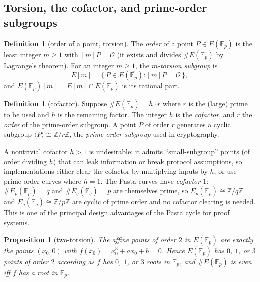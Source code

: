 \documentclass[11pt,a4paper]{article}
\newtheorem{proposition}[theorem]{Proposition}
\theoremstyle{definition}
\newtheorem{definition}[theorem]{Definition}
\theoremstyle{remark}
\newcommand{\Z}{\ensuremath{\mathbb{Z}}}
\newcommand{\Fp}{\ensuremath{\mathbb{F}_{p}}}
\newcommand{\Fq}{\ensuremath{\mathbb{F}_{q}}}
\begin{document}
\subsection{Torsion, the cofactor, and prime-order subgroups}

\begin{definition}[order of a point, torsion]\label{ellipticcurves:def-torsion}
The \emph{order} of a point \(P \in E(\Fp)\) is the least integer \(m \geq 1\) with \([m]P = \mathcal{O}\) (it exists and divides \(\#E(\Fp)\) by Lagrange's theorem). For an integer \(m \geq 1\), the \emph{\(m\)-torsion subgroup} is
\[
  E[m] = \{\, P \in E(\overline{\Fp}) : [m]P = \mathcal{O} \,\},
\]
and \(E(\Fp)[m] = E[m]\cap E(\Fp)\) is its rational part.
\end{definition}

\begin{definition}[cofactor]\label{ellipticcurves:def-cofactor}
Suppose \(\#E(\Fp) = h \cdot r\) where \(r\) is the (large) prime to be used and \(h\) is the remaining factor. The integer \(h\) is the \emph{cofactor}, and \(r\) the \emph{order} of the prime-order subgroup. A point \(P\) of order \(r\) generates a cyclic subgroup \(\langle P\rangle \cong \Z/r\Z\), the \emph{prime-order subgroup} used in cryptography.
\end{definition}

A nontrivial cofactor \(h > 1\) is undesirable: it admits ``small-subgroup'' points (of order dividing \(h\)) that can leak information or break protocol assumptions, so implementations either clear the cofactor by multiplying inputs by \(h\), or use prime-order curves where \(h = 1\). The Pasta curves have \emph{cofactor \(1\)}: \(\#E_p(\Fp) = q\) and \(\#E_q(\Fq) = p\) are themselves prime, so \(E_p(\Fp) \cong \Z/q\Z\) and \(E_q(\Fq) \cong \Z/p\Z\) are cyclic of prime order and no cofactor clearing is needed. This is one of the principal design advantages of the Pasta cycle for proof systems.

\begin{proposition}[two-torsion]\label{ellipticcurves:prop-twotorsion}
The affine points of order \(2\) in \(E(\Fp)\) are exactly the points \((x_0, 0)\) with \(f(x_0) = x_0^3 + a x_0 + b = 0\). Hence \(E(\Fp)\) has \(0\), \(1\), or \(3\) points of order \(2\) according as \(f\) has \(0\), \(1\), or \(3\) roots in \(\Fp\), and \(\#E(\Fp)\) is even iff \(f\) has a root in \(\Fp\).
\end{proposition}
\end{document}
